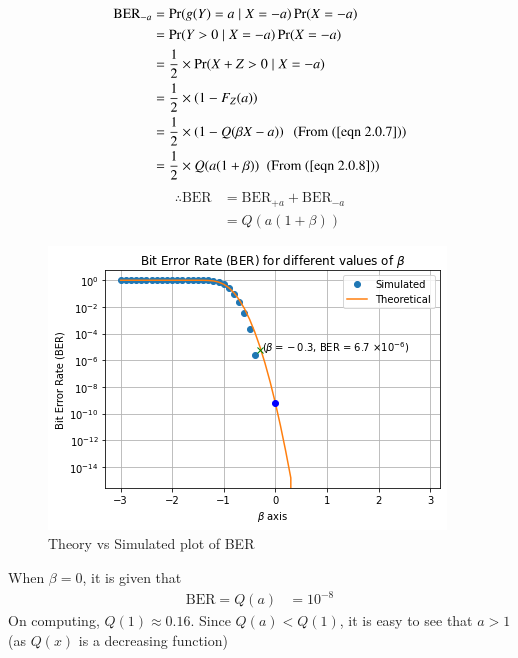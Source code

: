 \begin{align}
\text{BER}_{-a} %
&= \Pr(g(Y) = a \;|\; X = -a) \Pr(X=-a)\\
&= \Pr(Y > 0 \;|\; X = -a) \Pr(X=-a)\\
&= \dfrac{1}{2} \times \Pr(X+Z > 0 \;|\; X = -a) \\
&= \dfrac{1}{2} \times \left( 1 - F_Z(a) \right) \\
&= \dfrac{1}{2} \times \left( 1 - Q(\beta X -a) \right) \; \text{ (From (\ref{eqn 2.0.7}))}\\
&= \dfrac{1}{2} \times Q(a(1+\beta)) \; \text{ (From (\ref{eqn 2.0.8}))}
\end{align}
\begin{align}
\therefore \text{BER} &= \text{BER}_{+a} + \text{BER}_{-a}\\
&= Q(a(1+\beta))
\end{align} 
\begin{figure}[!hbt]
    \centering
	\includegraphics[width=\columnwidth]{solutions/ec/45/Figures/Figure_3.png}
    \caption{Theory vs Simulated plot of BER}
    \label{CDF_Y}
\end{figure}
When $\beta = 0$, it is given that 
\begin{align}
\text{BER} = Q(a) &= 10^{-8}
\end{align}
On computing, $Q(1) \approx 0.16$. Since $Q(a)<Q(1)$, it is easy to see that $a>1$ (as $Q(x)$ is a decreasing function)
